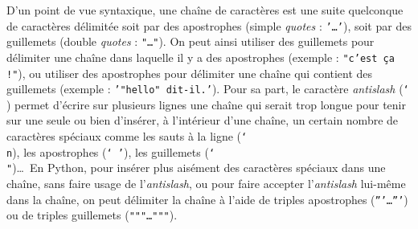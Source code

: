 D'un point de vue syntaxique, une chaîne de caractères est une suite quelconque de 
caractères délimitée soit par des apostrophes (simple {\em quotes} : {\tt '\ldots'}), 
soit par des guillemets (double {\em quotes} : {\tt "\ldots"}).
On peut ainsi utiliser des guillemets pour délimiter une chaîne dans laquelle il y a des
apostrophes (exemple : {\tt "c'est ça !"}), ou utiliser des apostrophes pour délimiter 
une chaîne qui contient des guillemets (exemple : {\tt '"hello" dit-il.'}).
Pour sa part, le caractère {\em antislash} ({\tt \char`\\}) permet 
d'écrire sur plusieurs lignes une chaîne qui serait trop longue pour
tenir sur une seule ou bien d'insérer, à l'intérieur d'une chaîne, un certain nombre de caractères
spéciaux comme les sauts à la ligne ({\tt \char`\\n}), les apostrophes ({\tt \char`\\'}), 
les guillemets ({\tt \char`\\"})\ldots\ 
En {\sc Python}, pour insérer plus aisément des caractères spéciaux dans une chaîne, 
sans faire usage de l'{\em antislash}, ou pour faire accepter l'{\em antislash} lui-même 
dans la chaîne, on peut délimiter la chaîne à l'aide 
de triples apostrophes ({\tt '''\ldots'''}) ou de triples guillemets ({\tt """\ldots"""}).

